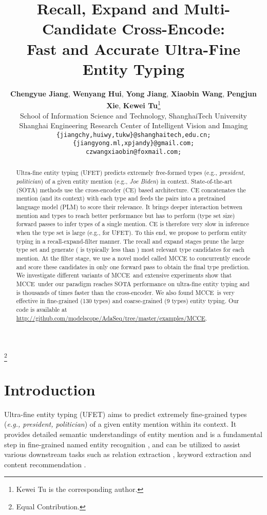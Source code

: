 \documentclass[11pt]{article}
\title{Recall, Expand and Multi-Candidate Cross-Encode: \\
Fast and Accurate Ultra-Fine Entity Typing}
\author{
    \textbf{Chengyue Jiang},
    \textbf{Wenyang Hui},
    \textbf{Yong Jiang},
    \textbf{Xiaobin Wang},
    \textbf{Pengjun Xie},
    \textbf{Kewei Tu}\thanks{ Kewei Tu is the corresponding author.} \\
     School of Information Science and Technology, ShanghaiTech University \\
    Shanghai Engineering Research Center of Intelligent Vision and Imaging \\
    \texttt{\{jiangchy,huiwy,tukw\}@shanghaitech,edu.cn;} \\
    \texttt{\{jiangyong.ml,xpjandy\}@gmail.com;} \\
    \texttt{czwangxiaobin@foxmail.com;}
}
\newcommand\blfootnote[1]{\begingroup
  \renewcommand\thefootnote{}\footnote{#1}\addtocounter{footnote}{-1}\endgroup
}
\begin{document}
\maketitle

\blfootnote{ Equal Contribution.}
\newcommand{\code}{\url{http://github.com/modelscope/AdaSeq/tree/master/examples/MCCE}}
\newcommand{\name}{{MCCE}}

\begin{abstract}
Ultra-fine entity typing (UFET) predicts extremely free-formed types (e.g., {\it president, politician}) of a given entity mention (e.g., {\it Joe Biden}) in context. State-of-the-art (SOTA) methods use the cross-encoder (CE) based architecture. CE concatenates the mention (and its context) with each type and feeds the pairs into a pretrained language model (PLM) to score their relevance. It brings deeper interaction between mention and types to reach better performance but has to perform  (type set size) forward passes to infer types of a single mention. CE is therefore very slow in inference when the type set is large (e.g.,  for UFET). 
To this end, we propose to perform entity typing in a recall-expand-filter manner. The recall and expand stages prune the large type set and generate  ( is typically less than ) most relevant type candidates for each mention. At the filter stage, we use a novel model called {\name} to concurrently encode and score these  candidates in only one forward pass to obtain the final type prediction. 
We investigate different variants of \name\  and extensive experiments show that \name\  under our paradigm reaches SOTA performance on ultra-fine entity typing and is thousands of times faster than the cross-encoder. We also found \name\ is very effective in fine-grained (130 types) and coarse-grained (9 types) entity typing. Our code is available at \code.
\end{abstract} \section{Introduction}
Ultra-fine entity typing (UFET) \cite{ufet} aims to predict extremely fine-grained types ({\it e.g., president, politician}) of a given entity mention within its context. It provides detailed semantic understandings of entity mention and is a fundamental step in fine-grained named entity recognition \cite{fget}, and can be utilized to assist various downstream tasks such as relation extraction \cite{fewrel}, keyword extraction \cite{huang2020ner} and content recommendation \cite{upadhyay2021explainable}.
\end{document}

